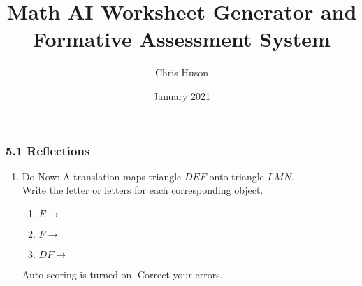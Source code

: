 \documentclass[12pt, twoside]{article}
\title{Math AI Worksheet Generator and Formative Assessment System}
\author{Chris Huson}
\date{January 2021}
\begin{document}
\subsubsection*{5.1 Reflections}
\begin{enumerate}

\item Do Now: A translation maps triangle $DEF$ onto triangle $LMN$. \\[0.5cm]
Write the letter or letters for each corresponding object. \vspace{0.5cm}
    \begin{multicols}{2}

      \begin{enumerate}
        \item $E \rightarrow$ \vspace{1.5cm}
        \item $F \rightarrow$ \vspace{1.5cm}
        \item $DF \rightarrow$ \vspace{1.5cm}
      \end{enumerate}
    \end{multicols}
    \begin{flushright}
      Auto scoring is turned on. Correct your errors.
    \end{flushright}


\end{enumerate}
\end{document}
